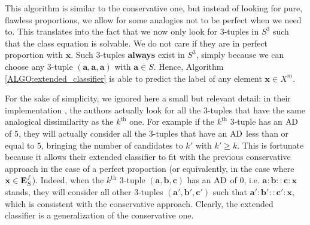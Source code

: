 This algorithm is similar to the conservative one, but instead of looking for
pure, flawless proportions, we allow for some analogies not to be perfect when
we need to. This translates into the fact that we now only
look for $3$-tuples in $S^3$ such that the class equation is solvable. We do
not care if they are in perfect proportion with $\mathbf{x}$. Such
$3$-tuples \textbf{always} exist in $S^3$, simply because we can choose any
$3$-tuple $(\mathbf{a}, \mathbf{a}, \mathbf{a})$ with $\mathbf{a} \in S$.
Hence, Algorithm \ref{ALGO:extended_classifier} is able to predict the label of
any element $\mathbf{x} \in X^m$.

For the sake of simplicity, we ignored here a small but relevant detail:
in their implementation \cite{BayMicDelIJCAI07}, the authors actually look for
all the 3-tuples that have the same analogical dissimilarity as the
$k^\text{th}$ one. For example if the $k^\text{th}$ 3-tuple has an $\text{AD}$ of 5,
they will actually consider all the $3$-tuples that have an $\text{AD}$ less than or
equal to $5$, bringing the number of candidates to $k'$ with $k' \geq k$. This
is fortunate because it allows their extended classifier to
fit with the previous conservative approach in the case of a perfect
proportion (or equivalently, in the case where $\mathbf{x} \in \mathbf{E}_{S}^{f}$).  Indeed,
when the $k^\text{th}$ $3$-tuple $(\mathbf{a}, \mathbf{b}, \mathbf{c})$ has an
$\text{AD}$ of $0$, i.e. $\mathbf{a} : \mathbf{b} :: \mathbf{c} : \mathbf{x}$ stands,
they will consider all other $3$-tuples $(\mathbf{a}',
\mathbf{b}',\mathbf{c}')$ such that $\mathbf{a}' : \mathbf{b}' :: \mathbf{c}' :
\mathbf{x}$, which is consistent with the conservative approach. Clearly, the
extended classifier is a generalization of the conservative one.

